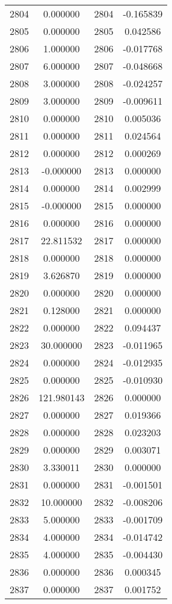 \documentclass[12pt]{article}
\begin{document}
\begin{longtable}{@{}cccc@{}}
2804 & 0.000000 & 2804 & -0.165839 \\
2805 & 0.000000 & 2805 & 0.042586 \\
2806 & 1.000000 & 2806 & -0.017768 \\
2807 & 6.000000 & 2807 & -0.048668 \\
2808 & 3.000000 & 2808 & -0.024257 \\
2809 & 3.000000 & 2809 & -0.009611 \\
2810 & 0.000000 & 2810 & 0.005036 \\
2811 & 0.000000 & 2811 & 0.024564 \\
2812 & 0.000000 & 2812 & 0.000269 \\
2813 & -0.000000 & 2813 & 0.000000 \\
2814 & 0.000000 & 2814 & 0.002999 \\
2815 & -0.000000 & 2815 & 0.000000 \\
2816 & 0.000000 & 2816 & 0.000000 \\
2817 & 22.811532 & 2817 & 0.000000 \\
2818 & 0.000000 & 2818 & 0.000000 \\
2819 & 3.626870 & 2819 & 0.000000 \\
2820 & 0.000000 & 2820 & 0.000000 \\
2821 & 0.128000 & 2821 & 0.000000 \\
2822 & 0.000000 & 2822 & 0.094437 \\
2823 & 30.000000 & 2823 & -0.011965 \\
2824 & 0.000000 & 2824 & -0.012935 \\
2825 & 0.000000 & 2825 & -0.010930 \\
2826 & 121.980143 & 2826 & 0.000000 \\
2827 & 0.000000 & 2827 & 0.019366 \\
2828 & 0.000000 & 2828 & 0.023203 \\
2829 & 0.000000 & 2829 & 0.003071 \\
2830 & 3.330011 & 2830 & 0.000000 \\
2831 & 0.000000 & 2831 & -0.001501 \\
2832 & 10.000000 & 2832 & -0.008206 \\
2833 & 5.000000 & 2833 & -0.001709 \\
2834 & 4.000000 & 2834 & -0.014742 \\
2835 & 4.000000 & 2835 & -0.004430 \\
2836 & 0.000000 & 2836 & 0.000345 \\
2837 & 0.000000 & 2837 & 0.001752 \\

\end{longtable}
\end{document}
